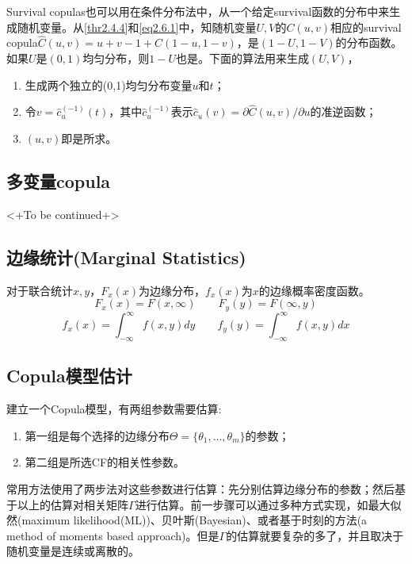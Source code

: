Survival copulas也可以用在条件分布法中，从一个给定survival函数的分布中来生成随机变量。从\cref{thr2.4.4}和\cref{eq2.6.1}中，知随机变量$U,V$的$C(u,v)$相应的survival copula$\hat{C}(u,v) = u+v-1+C(1-u,1-v)$，是$(1-U,1-V)$的分布函数。如果$U$是$(0,1)$均匀分布，则$1-U$也是。下面的算法用来生成$(U,V)$，
\begin{enumerate}[1.]
    \item 生成两个独立的(0,1)均匀分布变量$u$和$t$；
    \item 令$v = \hat{c}_u^{(-1)}(t)$，其中$\hat{c}_u^{(-1)}$表示$\hat{c}_u(v) = \partial \hat{C}(u,v)/\partial u$的准逆函数；
    \item $(u,v)$即是所求。
\end{enumerate}

\subsection{多变量copula}
<+To be continued+>








\subsection{边缘统计(Marginal Statistics)}
对于联合统计$x,y$，$F_x(x)$为边缘分布，$f_x(x)$为$x$的边缘概率密度函数。
\begin{equation}
    F_x(x) = F(x,\infty) \qquad F_y(y) = F(\infty,y)
    \label{eq0.1}
\end{equation}
\begin{equation}
    f_x(x) = \int_{-\infty}^{\infty} f(x,y) dy \qquad f_y(y) = \int_{-\infty}^{\infty} f(x,y) dx
    \label{eq0.2}
\end{equation}
\subsection{Copula模型估计}
建立一个Copula模型，有两组参数需要估算\cite{Smith2009}:
\begin{enumerate}
    \item 第一组是每个选择的边缘分布$\Theta = \{\theta_1,\dots,\theta_m\}$的参数；
    \item 第二组是所选CF的相关性参数。
\end{enumerate}
常用方法使用了两步法对这些参数进行估算：先分别估算边缘分布的参数；然后基于以上的估算对相关矩阵$\Gamma$进行估算。前一步骤可以通过多种方式实现，如最大似然(maximum likelihood(ML))、贝叶斯(Bayesian)、或者基于时刻的方法(a method of moments based approach)。但是$\Gamma$的估算就要复杂的多了，并且取决于随机变量是连续或离散的。

